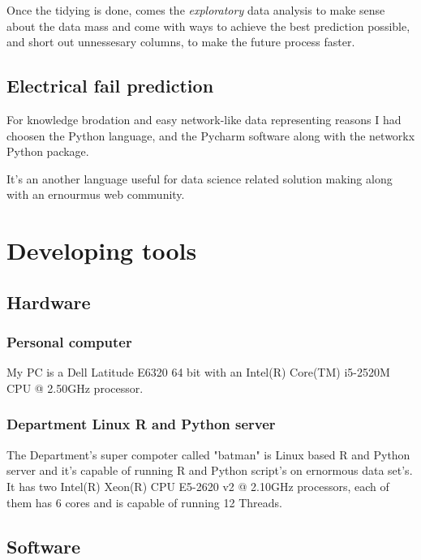 Once the tidying is done, comes the \textit{exploratory} data analysis to make sense about the data mass and come with ways to achieve the best prediction possible, and short out unnessesary columns, to make the future process faster.
		\subsection{Electrical fail prediction}
For knowledge brodation and easy network-like data representing reasons I had choosen the Python language, and the Pycharm software along with the networkx Python package.

It's an another language useful for data science related solution making along with an ernourmus web community.
	\section{Developing tools}
		\subsection{Hardware}
			\subsubsection{Personal computer}
My PC is a Dell Latitude E6320 64 bit with an Intel(R) Core(TM) i5-2520M CPU @ 2.50GHz processor.
\cite{Latitude}
			\subsubsection{Department Linux R and Python server}
The Department's super compoter called "batman" is Linux based R and Python server and it's capable of running R and Python script's on ernormous data set's. It has two Intel(R) Xeon(R) CPU E5-2620 v2 @ 2.10GHz processors, each of them has 6 cores and is capable of running 12 Threads.
\cite{Batman}
		\subsection{Software}
